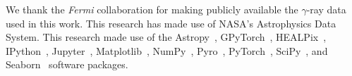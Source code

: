 \documentclass[]{article}
\begin{document}
\begin{ack}
We thank the \emph{Fermi} collaboration for making publicly available the $\gamma$-ray data used in this work. This research has made use of NASA's Astrophysics Data System. This research made use of the Astropy~\cite{Robitaille:2013mpa,Price-Whelan:2018hus},
GPyTorch~\cite{gardner2018gpytorch},
HEALPix~\cite{Gorski:2004by,Zonca2019},
IPython~\cite{PER-GRA:2007},
Jupyter~\cite{Kluyver2016JupyterN},
Matplotlib~\cite{Hunter:2007},
NumPy~\cite{harris_array_2020},
Pyro~\cite{bingham2019pyro},
PyTorch~\cite{NEURIPS2019_9015},
SciPy~\cite{2020SciPy-NMeth}, and
Seaborn~\cite{michael_waskom_2017_883859}
software packages.
\end{ack}





\end{document}
